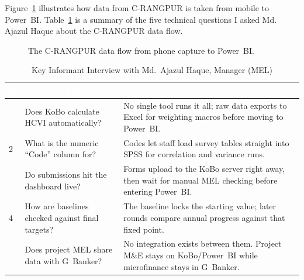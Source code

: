 \documentclass[12pt,a4paper]{report}
\newcommand{\headercell}[1]{\textcolor{white}{\textbf{#1}}}
\begin{document}
Figure~\ref{fig:crangpur-flow} illustrates how data from C-RANGPUR is taken from mobile to Power~BI. Table~\ref{tab:kii-ajazul} is a summary of the five technical questions I asked Md. Ajazul Haque about the C-RANGPUR data flow.

\begin{figure}[htbp]
\centering
{}
\caption{The C-RANGPUR data flow from phone capture to Power~BI.}
\label{fig:crangpur-flow}
\end{figure}

\begin{table}[htbp]
\centering\small\caption{Key Informant Interview with Md.~Ajazul Haque, Manager (MEL)}\label{tab:kii-ajazul}
\begin{tabular}{|>{\centering\arraybackslash}p{0.8cm}|>{\raggedright\arraybackslash}p{4.2cm}|>{\raggedright\arraybackslash}p{8.2cm}|}
\hline
\rowcolor{RDRSBlue}\headercell{\#} & \headercell{Question Asked} & \headercell{Manager's Answer} \\ \hline
1 & Does KoBo calculate HCVI automatically? & No single tool runs it all; raw data exports to Excel for weighting macros before moving to Power~BI. \\ \hline
\rowcolor{RDRSLight} 2 & What is the numeric ``Code'' column for? & Codes let staff load survey tables straight into SPSS for correlation and variance runs. \\ \hline
3 & Do submissions hit the dashboard live? & Forms upload to the KoBo server right away, then wait for manual MEL checking before entering Power~BI. \\ \hline
\rowcolor{RDRSLight} 4 & How are baselines checked against final targets? & The baseline locks the starting value; later rounds compare annual progress against that fixed point. \\ \hline
5 & Does project MEL share data with G~Banker? & No integration exists between them. Project M\&E stays on KoBo/Power~BI while microfinance stays in G~Banker. \\ \hline
\end{tabular}
\end{table}
\end{document}
